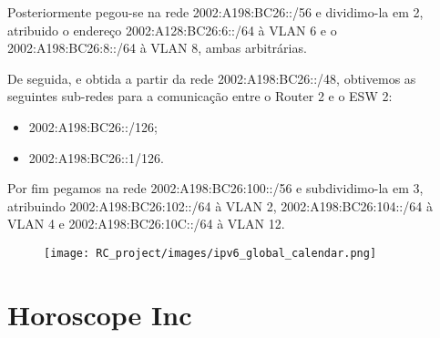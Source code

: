 \documentclass{report}
\begin{document}
Posteriormente pegou-se na rede 2002:A198:BC26::/56 e dividimo-la em 2, atribuido o endereço 2002:A128:BC26:6::/64 à VLAN 6 e o 2002:A198:BC26:8::/64 à VLAN 8, ambas arbitrárias.

De seguida, e obtida a partir da rede 2002:A198:BC26::/48, obtivemos as seguintes sub-redes para a comunicação entre o Router 2 e o ESW 2:
\begin{itemize}
    \item 2002:A198:BC26::/126;
    \item 2002:A198:BC26::1/126.
\end{itemize}

Por fim pegamos na rede 2002:A198:BC26:100::/56 e subdividimo-la em 3, atribuindo 2002:A198:BC26:102::/64 à VLAN 2, 2002:A198:BC26:104::/64 à VLAN 4 e 2002:A198:BC26:10C::/64 à VLAN 12.

\newpage
\begin{figure}[H]
    \hspace*{-4.0cm}
    \centering
    \texttt{[image: RC\_project/images/ipv6\_global\_calendar.png]}
\end{figure}

\newpage
\clearpage

\section*{Horoscope Inc}

\end{document}
